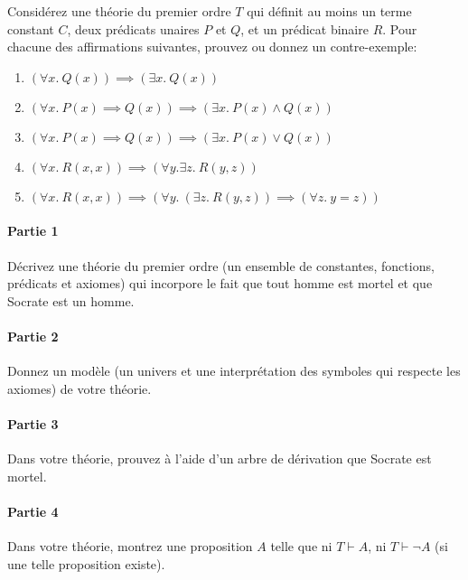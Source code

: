 \documentclass[12pt,french,a4paper]{article}
\begin{document}
\begin{question}

Considérez une théorie du premier ordre $T$ qui définit au moins un terme constant $C$, deux prédicats unaires $P$ et $Q$, et un prédicat binaire $R$.
Pour chacune des affirmations suivantes, prouvez ou donnez un contre-exemple:
\begin{enumerate}
\item $(\forall x.\ Q(x)) \implies (\exists x.\ Q(x))$
\item $(\forall x.\ P(x) \implies Q(x)) \implies (\exists x.\ P(x) \wedge Q(x))$
\item $(\forall x.\ P(x) \implies Q(x)) \implies (\exists x.\ P(x) \vee Q(x))$
\item $(\forall x.\ R(x, x)) \implies (\forall y. \exists z.\ R(y, z))$
\item $(\forall x.\ R(x, x)) \implies (\forall y.\ (\exists z.\ R(y, z)) \implies (\forall z.\ y = z))$
\end{enumerate}
\end{question}


\begin{question}

\paragraph{Partie 1}
Décrivez une théorie du premier ordre (un ensemble de constantes, fonctions, prédicats et axiomes) qui incorpore le fait que tout homme est mortel et que Socrate est un homme.

\paragraph{Partie 2}
Donnez un modèle (un univers et une interprétation des symboles qui respecte les axiomes) de votre théorie.

\paragraph{Partie 3}
Dans votre théorie, prouvez à l'aide d'un arbre de dérivation que Socrate est mortel.

\paragraph{Partie 4}
Dans votre théorie, montrez une proposition $A$ telle que ni $T \vdash A$, ni $T \vdash \neg A$ (si une telle proposition existe).
\end{question}
\end{document}
